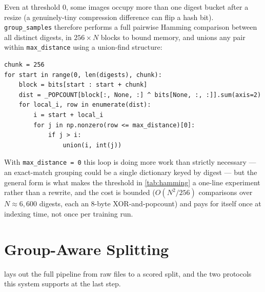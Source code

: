 \documentclass[11pt,a4paper,oneside]{report}
\newcommand{\code}[1]{\texttt{\small #1}}
\begin{document}
Even at threshold 0, some images occupy more than one digest bucket after a
resize (a genuinely-tiny compression difference can flip a hash bit).
\code{group\_samples} therefore performs a full pairwise Hamming comparison
between all distinct digests, in $256\times N$ blocks to bound memory, and
unions any pair within \code{max\_distance} using a union-find structure:

\begin{lstlisting}[caption={Blocked pairwise Hamming distance plus union-find
(\texttt{lxnet/data.py}).}, label=lst:unionfind]
chunk = 256
for start in range(0, len(digests), chunk):
    block = bits[start : start + chunk]
    dist = _POPCOUNT[block[:, None, :] ^ bits[None, :, :]].sum(axis=2)
    for local_i, row in enumerate(dist):
        i = start + local_i
        for j in np.nonzero(row <= max_distance)[0]:
            if j > i:
                union(i, int(j))
\end{lstlisting}

With \code{max\_distance = 0} this loop is doing more work than strictly
necessary --- an exact-match grouping could be a single dictionary keyed by
digest --- but the general form is what makes the threshold in
\cref{tab:hamming} a one-line experiment rather than a rewrite, and the cost
is bounded ($O(N^2/256)$ comparisons over $N \approx 6{,}600$ digests,
each an 8-byte XOR-and-popcount) and pays for itself once at indexing time,
not once per training run.

\section{Group-Aware Splitting}
\label{sec:group-aware-split}

 lays out the full pipeline from raw files to a
scored split, and the two protocols this system supports at the last step.
\end{document}
